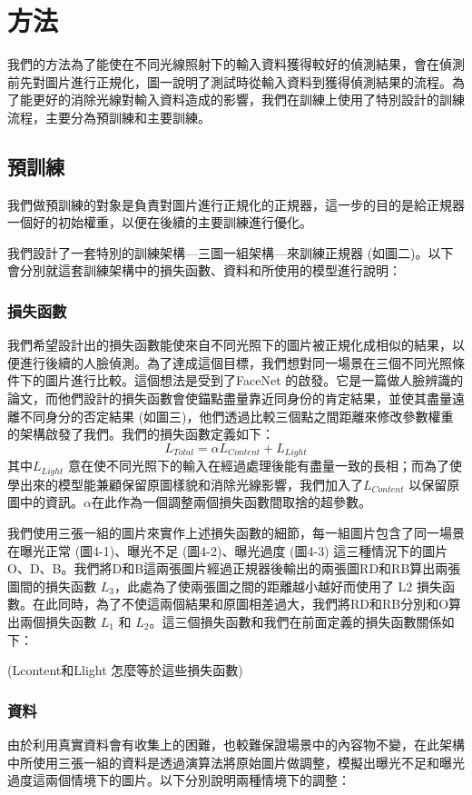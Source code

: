\chapter{方法}
\label{c:method}

我們的方法為了能使在不同光線照射下的輸入資料獲得較好的偵測結果，會在偵測前先對圖片進行正規化，圖一說明了測試時從輸入資料到獲得偵測結果的流程。為了能更好的消除光線對輸入資料造成的影響，我們在訓練上使用了特別設計的訓練流程，主要分為預訓練和主要訓練。

\section{預訓練}

我們做預訓練的對象是負責對圖片進行正規化的正規器，這一步的目的是給正規器一個好的初始權重，以便在後續的主要訓練進行優化。

我們設計了一套特別的訓練架構—三圖一組架構—來訓練正規器 (如圖二)。以下會分別就這套訓練架構中的損失函數、資料和所使用的模型進行說明：

\subsection{損失函數}

我們希望設計出的損失函數能使來自不同光照下的圖片被正規化成相似的結果，以便進行後續的人臉偵測。為了達成這個目標，我們想對同一場景在三個不同光照條件下的圖片進行比較。這個想法是受到了FaceNet 的啟發。它是一篇做人臉辨識的論文，而他們設計的損失函數會使錨點盡量靠近同身份的肯定結果，並使其盡量遠離不同身分的否定結果 (如圖三)，他們透過比較三個點之間距離來修改參數權重的架構啟發了我們。我們的損失函數定義如下：
$$L_{Total} = \alpha L_{Content} + L_{Light}$$
其中$L_{Light}$ 意在使不同光照下的輸入在經過處理後能有盡量一致的長相；而為了使學出來的模型能兼顧保留原圖樣貌和消除光線影響，我們加入了$L_{Content}$ 以保留原圖中的資訊。$\alpha$在此作為一個調整兩個損失函數間取捨的超參數。

我們使用三張一組的圖片來實作上述損失函數的細節，每一組圖片包含了同一場景在曝光正常 (圖4-1)、曝光不足 (圖4-2)、曝光過度 (圖4-3) 這三種情況下的圖片O、D、B。我們將D和B這兩張圖片經過正規器後輸出的兩張圖RD和RB算出兩張圖間的損失函數 $L_3$，此處為了使兩張圖之間的距離越小越好而使用了 L2 損失函數。在此同時，為了不使這兩個結果和原圖相差過大，我們將RD和RB分別和O算出兩個損失函數 $L_1$ 和 $L_2$。這三個損失函數和我們在前面定義的損失函數關係如下：

(Lcontent和Llight 怎麼等於這些損失函數)

\subsection{資料}
由於利用真實資料會有收集上的困難，也較難保證場景中的內容物不變，在此架構中所使用三張一組的資料是透過演算法將原始圖片做調整，模擬出曝光不足和曝光過度這兩個情境下的圖片。以下分別說明兩種情境下的調整：

